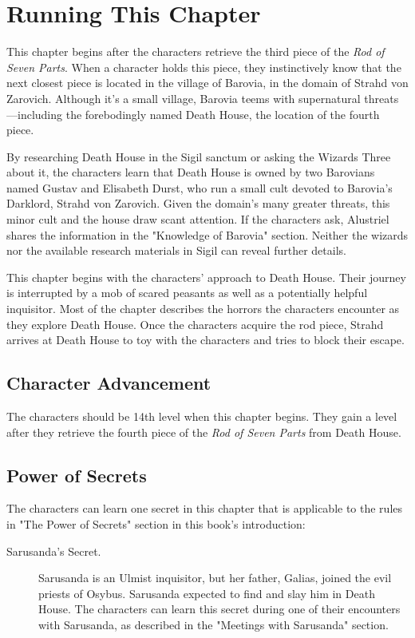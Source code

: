 \documentclass[10pt,a4paper,twoside,bg=print,twocolumn,openany,nodeprecatedcode]{dndbook}
\begin{document}
\section{Running This Chapter}
This chapter begins after the characters retrieve the third piece of the \textit{Rod of Seven Parts}. When a character holds this piece, they instinctively know that the next closest piece is located in the village of Barovia, in the domain of Strahd von Zarovich. Although it's a small village, Barovia teems with supernatural threats—including the forebodingly named Death House, the location of the fourth piece.

By researching Death House in the Sigil sanctum or asking the Wizards Three about it, the characters learn that Death House is owned by two Barovians named Gustav and Elisabeth Durst, who run a small cult devoted to Barovia's Darklord, Strahd von Zarovich. Given the domain's many greater threats, this minor cult and the house draw scant attention. If the characters ask, Alustriel shares the information in the "Knowledge of Barovia" section. Neither the wizards nor the available research materials in Sigil can reveal further details.

This chapter begins with the characters' approach to Death House. Their journey is interrupted by a mob of scared peasants as well as a potentially helpful inquisitor. Most of the chapter describes the horrors the characters encounter as they explore Death House. Once the characters acquire the rod piece, Strahd arrives at Death House to toy with the characters and tries to block their escape.

\subsection{Character Advancement}
The characters should be 14th level when this chapter begins. They gain a level after they retrieve the fourth piece of the \textit{Rod of Seven Parts} from Death House.

\subsection{Power of Secrets}
The characters can learn one secret in this chapter that is applicable to the rules in "The Power of Secrets" section in this book's introduction:


\begin{description}
\item[Sarusanda's Secret.]
Sarusanda is an Ulmist inquisitor, but her father, Galias, joined the evil priests of Osybus. Sarusanda expected to find and slay him in Death House. The characters can learn this secret during one of their encounters with Sarusanda, as described in the "Meetings with Sarusanda" section.
\end{description}
\end{document}
